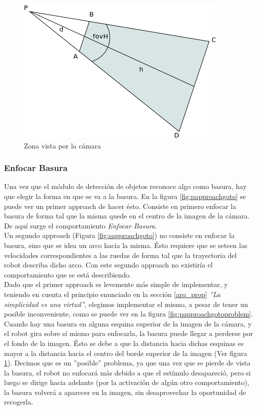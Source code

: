 \begin{figure}[htp]
\begin{center}
\includegraphics[scale=0.5]{comportamientos/rectangleWander.png}
\caption{Zona vista por la c\'amara}
\label{fig:zoneCamera}
\end{center}
\end{figure}

\subsubsection{Enfocar Basura}
\label{focus_garbage}
Una vez que el m\'odulo de detecci\'on de objetos reconoce algo como basura, hay que elegir
la forma en que se va a la basura. En la figura \ref{fig:papproachgoto} se puede ver un
primer approach de hacer \'esto. Consiste en primero enfocar la basura de forma tal que
la misma quede en el centro de la imagen de la c\'amara. De aqu\'i surge el comportamiento
\emph{Enfocar Basura}.
\\
Un segundo approach (Figura \ref{fig:sapproachgoto}) no consiste en enfocar la basura,
sino que se idea un arco hacia la misma. \'Esto requiere que se seteen las velocidades
correspondientes a las ruedas de forma tal que la trayectoria del robot describa dicho
arco. Con este segundo approach no existir\'ia el comportamiento que se est\'a describiendo.
\\
Dado que el primer approach es levemente m\'as simple de implementar, y teniendo en cuenta el
principio enunciado en la secci\'on \ref{arq_prop} \emph{''La simplicidad es una virtud''},
elegimos implementar el mismo, a pesar de tener un posible inconveniente, como se puede
ver en la figura \ref{fig:papproachgotoproblem}.
\\
Cuando hay una basura en alguna esquina
superior de la imagen de la c\'amara, y el robot gira sobre s\'i mismo para enfocarla,
la basura puede llegar a perderse por el fondo de la imagen. \'Esto se debe a que la distancia
hacia dichas esquinas es mayor a la distancia hacia el centro del borde superior de la imagen
(Ver figura \ref{fig:zoneCamera}). Decimos que es un ''posible'' problema, ya que una vez que se
pierde de vista la basura, el robot no enfocar\'a m\'as debido a que el est\'imulo desapareci\'o,
pero si luego se dirige hacia adelante (por la activaci\'on de alg\'un otro comportamiento), 
la basura volver\'a a aparecer en la imagen, sin desaprovechar la oportunidad de recogerla.

